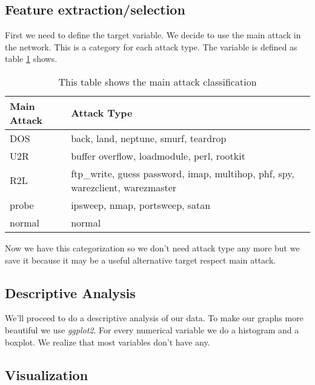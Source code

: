 \documentclass[a4paper]{article} %
\begin{document}
\subsection{Feature extraction/selection}
First we need to define the target variable. We decide to use the main attack in the network. This is a category for each attack type. The variable is defined as table \ref{table:main} shows. 
\begin{table}
	\begin{tabular}{ll}
		Main Attack & Attack Type                                                            \\ \hline
		DOS         & back, land, neptune, smurf, teardrop                                       \\
		U2R         & buffer overflow, loadmodule, perl, rootkit                               \\
		R2L         & ftp\_write, guess password, imap, multihop, phf, spy, warezclient, warezmaster \\
		probe       & ipsweep, nmap, portsweep, satan                                           \\
		normal      & normal                                                                 \\
	\end{tabular}
	\caption{This table shows the main attack classification}
	\label{table:main}
	
\end{table}
Now we have this categorization so we don't need attack type any more but we save it because it may be a useful alternative target respect main attack. 


\subsection{Descriptive Analysis}
We'll proceed to do a descriptive analysis of our data. To make our graphs more beautiful we use \textit{ggplot2}\cite{ggplot}. For every numerical variable we do a histogram and a boxplot. We realize that most variables don't have any.
\subsection{Visualization}
\end{document}

